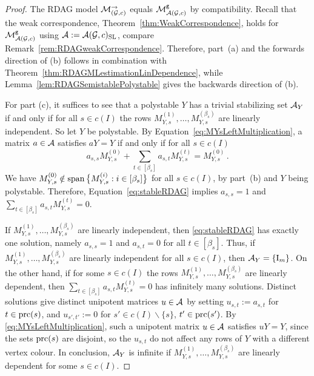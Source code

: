 \begin{proof}
	The RDAG model $\mathcal{M}_{(\mathcal{G}, c)}^{\to}$ equals $\mathcal{M}^{\mathtt{g}}_{\mathcal{A}(\mathcal{G}, c)}$ by compatibility.
	Recall that the weak correspondence, Theorem~\ref{thm:WeakCorrespondence}, holds for $\mathcal{M}^{\mathtt{g}}_{\mathcal{A}(\mathcal{G}, c)}$ using $\mathcal{A} := \mathcal{A}(\mathcal{G}, c)_{\operatorname{SL}}$, compare Remark~\ref{rem:RDAGweakCorrespondence}. Therefore, part~(a) and the forwards direction of (b) follows in combination with Theorem~\ref{thm:RDAGMLestimationLinDependence}, while Lemma~\ref{lem:RDAGSemistablePolystable} gives the backwards direction of (b).
	
	For part (c), it suffices to see that a polystable $Y$ has a trivial stabilizing set $\mathcal{A}_Y$ if and only if for all $s \in c(I)$ the rows $M_{Y,s}^{(1)},\ldots, M_{Y,s}^{(\beta_s)}$ are linearly independent. So let $Y$ be polystable. By Equation~\eqref{eq:MYsLeftMultiplication}, a matrix $a \in \mathcal{A}$ satisfies $aY = Y$ if and only if for all $s \in c(I)$
	\begin{equation}\label{eq:stableRDAG}
		a_{s,s} M_{Y,s}^{(0)} + \sum_{t \in [\beta_s]} a_{s,t} M_{Y,s}^{(t)} = M_{Y,s}^{(0)} \, .
	\end{equation}
	We have $M_{Y,s}^{(0)} \notin \operatorname{span}  \big\lbrace M_{Y,s}^{(i)} : i \in [\beta_s] \big\rbrace$ for all $s \in c(I)$, by part~(b) and $Y$ being polystable. Therefore, Equation~\eqref{eq:stableRDAG} implies $a_{s,s} = 1$ and $\sum_{t \in [\beta_s]} a_{s,t} M_{Y,s}^{(t)} = 0$.
	
	If $M_{Y,s}^{(1)},\ldots, M_{Y,s}^{(\beta_s)}$ are linearly independent, then \eqref{eq:stableRDAG} has exactly one solution, namely $a_{s,s} = 1$ and $a_{s,t}=0$ for all $t \in [\beta_s]$. Thus, if $M_{Y,s}^{(1)},\ldots, M_{Y,s}^{(\beta_s)}$ are linearly independent for all $s \in c(I)$, then $\mathcal{A}_Y = \{\operatorname{I}_m \}$.
	On the other hand, if for some $s \in c(I)$ the rows $M_{Y,s}^{(1)},\ldots, M_{Y,s}^{(\beta_s)}$ are linearly dependent, then $\sum_{t \in [\beta_s]} a_{s,t} M_{Y,s}^{(t)} = 0$ has infinitely many solutions. Distinct solutions give distinct unipotent matrices $u \in \mathcal{A}$ by setting $u_{s,t} := a_{s,t}$ for $t \in \operatorname{prc}(s)$, and $u_{s',t'} := 0$ for $s' \in c(I) \backslash \{s\}$, $t' \in \operatorname{prc}(s')$. By \eqref{eq:MYsLeftMultiplication}, such a unipotent matrix $u \in \mathcal{A}$ satisfies $uY = Y$, since the sets $\operatorname{prc}(s)$ are disjoint, so the $u_{s,t}$ do not affect any rows of $Y$ with a different vertex colour. In conclusion, $\mathcal{A}_Y$ is infinite if $M_{Y,s}^{(1)},\ldots, M_{Y,s}^{(\beta_s)}$ are linearly dependent for some $s \in c(I)$.
\end{proof}


